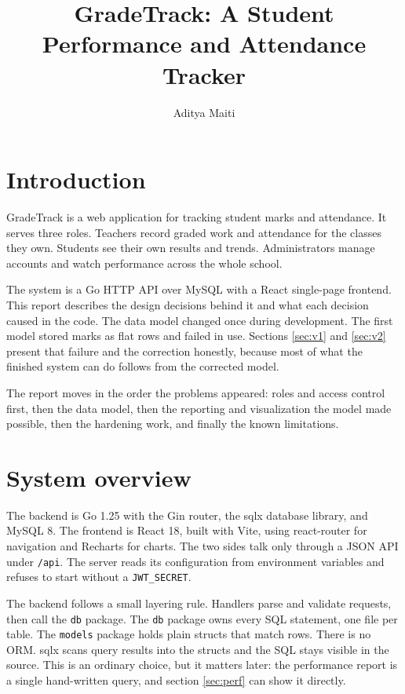 \documentclass[11pt,a4paper]{article}
\title{GradeTrack: A Student Performance and Attendance Tracker}
\author{Aditya Maiti}
\date{}
\begin{document}
\maketitle

\section{Introduction}

GradeTrack is a web application for tracking student marks and attendance. It serves three roles. Teachers record graded work and attendance for the classes they own. Students see their own results and trends. Administrators manage accounts and watch performance across the whole school.

The system is a Go HTTP API over MySQL with a React single-page frontend. This report describes the design decisions behind it and what each decision caused in the code. The data model changed once during development. The first model stored marks as flat rows and failed in use. Sections \ref{sec:v1} and \ref{sec:v2} present that failure and the correction honestly, because most of what the finished system can do follows from the corrected model.

The report moves in the order the problems appeared: roles and access control first, then the data model, then the reporting and visualization the model made possible, then the hardening work, and finally the known limitations.

\section{System overview}

The backend is Go 1.25 with the Gin router, the sqlx database library, and MySQL 8. The frontend is React 18, built with Vite, using react-router for navigation and Recharts for charts. The two sides talk only through a JSON API under \texttt{/api}. The server reads its configuration from environment variables and refuses to start without a \texttt{JWT\_SECRET}.

The backend follows a small layering rule. Handlers parse and validate requests, then call the \texttt{db} package. The \texttt{db} package owns every SQL statement, one file per table. The \texttt{models} package holds plain structs that match rows. There is no ORM. sqlx scans query results into the structs and the SQL stays visible in the source. This is an ordinary choice, but it matters later: the performance report is a single hand-written query, and section \ref{sec:perf} can show it directly.
\end{document}
